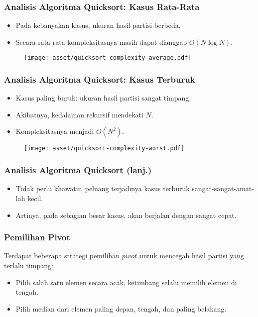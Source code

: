 \begin{frame}
\frametitle{Analisis Algoritma Quicksort: Kasus Rata-Rata}
\begin{itemize}
  \item Pada kebanyakan kasus, ukuran hasil partisi berbeda.
  \item Secara rata-rata kompleksitasnya masih dapat dianggap $O(N \log{N})$.
\end{itemize}
\begin{figure}
  \centering
  \texttt{[image: asset/quicksort-complexity-average.pdf]}
\end{figure}
\end{frame}

\begin{frame}
\frametitle{Analisis Algoritma Quicksort: Kasus Terburuk}
\begin{itemize}
  \item Kasus paling buruk: ukuran hasil partisi sangat timpang.
  \item Akibatnya, kedalaman rekursif mendekati $N$.
  \item Kompleksitasnya menjadi $O(N^2)$.
\end{itemize}
\begin{figure}
  \centering
  \texttt{[image: asset/quicksort-complexity-worst.pdf]}
\end{figure}
\end{frame}

\begin{frame}
\frametitle{Analisis Algoritma Quicksort (lanj.)}
\begin{itemize}
  \item Tidak perlu khawatir, peluang terjadinya kasus terburuk sangat-sangat-amat-lah  kecil.
  \item Artinya, pada sebagian besar kasus, \fquickSort akan berjalan dengan sangat cepat.
\end{itemize}
\end{frame}

\begin{frame}
\frametitle{Pemilihan Pivot}
Terdapat beberapa strategi pemilihan $pivot$ untuk mencegah hasil partisi yang terlalu timpang:
\begin{itemize}
  \item Pilih salah satu elemen secara acak, ketimbang selalu memilih elemen di tengah.
  \item Pilih median dari elemen paling depan, tengah, dan paling belakang.
  \newline
\end{itemize}
\end{frame}

